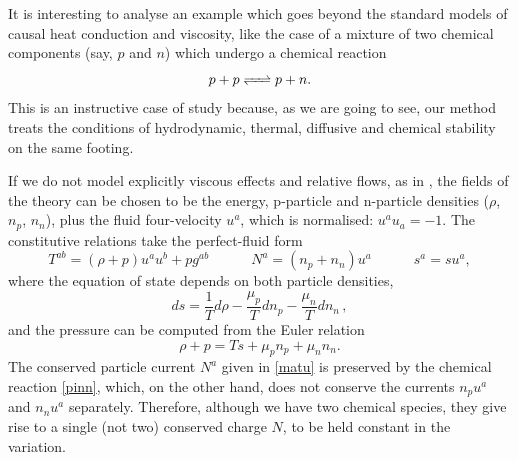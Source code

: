 \documentclass[a4paper, amsfonts, amssymb, amsmath, reprint, showkeys, nofootinbib, twoside, onecolumn,notitlepage]{revtex4-1}
\newcommand{\spc}{\quad \quad \quad}
\begin{document}
It is interesting to analyse an example which goes beyond the standard models of causal heat conduction and viscosity, like the case of a mixture of two chemical components (say, $p$ and $n$) which undergo a chemical reaction 
\begin{equation}\label{pinn}
p+p \ce{ <=> } p+n.
\end{equation}
This is an instructive case of study because, as we are going to see, our method treats the conditions of hydrodynamic, thermal, diffusive and chemical stability on the same footing.

If we do not model explicitly viscous effects and relative flows, as in \cite{Burrows1986,Alford2020}, the fields of the theory can be chosen to be the energy, p-particle and n-particle densities ($\rho$, $n_p$, $n_n$), plus the fluid four-velocity $u^a$, which is normalised: $u^a u_a=-1$. The constitutive relations take the perfect-fluid form \cite{noto_rel}
\begin{equation}\label{matu}
T^{ab}=(\rho+p)u^a u^b + p g^{ab}  \spc   N^a=(n_p+n_n)u^a  \spc s^a=su^a,
\end{equation}
where the equation of state depends on both particle densities,
\begin{equation}
ds = \dfrac{1}{T} d\rho - \dfrac{\mu_p}{T} dn_p - \dfrac{\mu_n}{T} dn_n \, ,
\end{equation}
and the pressure can be computed from the Euler relation
\begin{equation}
\rho + p = Ts + \mu_p n_p + \mu_n n_n.
\end{equation}
The conserved particle current $N^a$ given in \eqref{matu} is preserved by the chemical reaction \eqref{pinn}, which, on the other hand, does not conserve the currents $n_p u^a$ and $n_n u^a$ separately. Therefore, although we have two chemical species, they give rise to a single (not two) conserved charge $N$, to be held constant in the variation. 
\end{document}
